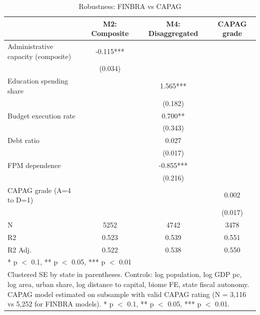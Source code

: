 \begin{table}
\centering
\caption{Robustness: FINBRA vs CAPAG}
\centering
\begin{tabular}[t]{lccc}
\toprule
  & M2: Composite & M4: Disaggregated & CAPAG grade\\
\midrule
Administrative capacity (composite) & -0.115*** &  & \\
 & (0.034) &  & \\
Education spending share &  & 1.565*** & \\
 &  & (0.182) & \\
Budget execution rate &  & 0.700** & \\
 &  & (0.343) & \\
Debt ratio &  & 0.027 & \\
 &  & (0.017) & \\
FPM dependence &  & -0.855*** & \\
 &  & (0.216) & \\
CAPAG grade (A=4 to D=1) &  &  & 0.002\\
 &  &  & (0.017)\\
\midrule
N & 5252 & 4742 & 3478\\
R2 & 0.523 & 0.539 & 0.551\\
R2 Adj. & 0.522 & 0.538 & 0.550\\
\bottomrule
\multicolumn{4}{l}{\rule{0pt}{1em}* p $<$ 0.1, ** p $<$ 0.05, *** p $<$ 0.01}\\
\multicolumn{4}{l}{\rule{0pt}{1em}Clustered SE by state in parentheses. Controls: log population, log GDP pc, log area, urban share, log distance to capital, biome FE, state fiscal autonomy. CAPAG model estimated on subsample with valid CAPAG rating (N = 3,116 vs 5,252 for FINBRA models). * p $<$ 0.1, ** p $<$ 0.05, *** p $<$ 0.01.}\\
\end{tabular}
\end{table}
